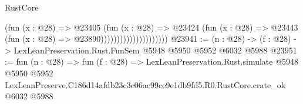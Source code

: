 \begin{lexlean}{RustCore}
\begin{coremodule}
                                      (fun (x : @28) =>
                                      @23405
                                        (fun (x : @28) =>
                                        @23424
                                          (fun (x : @28) =>
                                          @23443 (fun (x : @28) => @23890)))))))))))))))))))))
@23941 := (n : @28) -> (f : @28) -> LexLeanPreservation.Rust.FunSem @5948 @5950 @5952 @6032 @5988
@23951 := fun (n : @28) =>
  fun (f : @28) =>
  LexLeanPreservation.Rust.simulate
    @5948
    @5950
    @5952
    LexLeanPreserve.C186d14afdb23c3c06ac99ce9e1db9fd5.R0.RustCore.crate_ok
    @6032
    @5988
\end{coremodule}
\end{lexlean}
